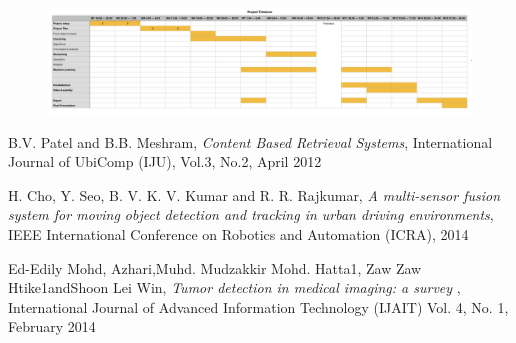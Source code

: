 \documentclass[11pt]{article}
\begin{document}
\begin{figure}[h]
	\centering
	\includegraphics[scale=0.35]{./img/time}
\end{figure}

\begin{thebibliography}{9}
	
	B.V. Patel and B.B. Meshram,
	\textit{Content Based Retrieval Systems},
	International Journal of UbiComp (IJU), Vol.3, No.2, 
	April 2012
	
	H. Cho, Y. Seo, B. V. K. V. Kumar and R. R. Rajkumar, 
	\textit{A multi-sensor fusion system for moving object detection and tracking in urban driving environments}, 
	IEEE International Conference on Robotics and Automation (ICRA), 
	2014

	Ed-Edily Mohd,  Azhari,Muhd. Mudzakkir Mohd. Hatta1, Zaw Zaw Htike1andShoon Lei Win, 
	\textit{Tumor detection in medical imaging: a survey }, 
	International Journal of Advanced Information Technology (IJAIT) Vol. 4, No. 1, 
	February 2014
	
	
	
\end{thebibliography}
\end{document}

